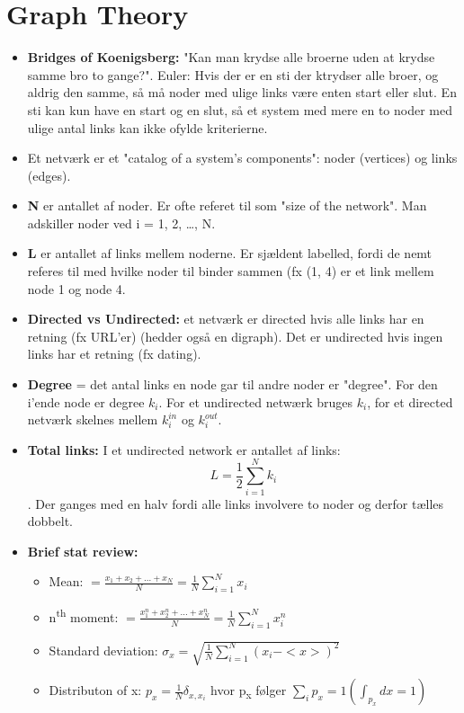 \documentclass[11pt]{article}
\begin{document}
\section{Graph Theory}
\label{sec:org0666558}
\begin{itemize}
\item \textbf{Bridges of Koenigsberg:} "Kan man krydse alle broerne uden at krydse samme bro to gange?". Euler: Hvis der er en sti der ktrydser alle broer, og aldrig den samme, så må noder med ulige links være enten start eller slut. En sti kan kun have en start og en slut, så et system med mere en to noder med ulige antal links kan ikke ofylde kriterierne.

\item Et netværk er et "catalog of a system's components": noder (vertices) og links (edges).

\item \textbf{N} er antallet af noder. Er ofte referet til som "size of the network". Man adskiller noder ved i = 1, 2, \ldots{}, N.

\item \textbf{L} er antallet af links mellem noderne. Er sjældent labelled, fordi de nemt referes til med hvilke noder til binder sammen (fx (1, 4) er et link mellem node 1 og node 4.

\item \textbf{Directed vs Undirected:} et netværk er directed hvis alle links har en retning (fx URL'er) (hedder også en digraph). Det er undirected hvis ingen links har et retning (fx dating).

\item \textbf{Degree} = det antal links en node gar til andre noder er "degree". For den i'ende node er degree \(k_i\). For et undirected netwærk bruges \(k_i\), for et directed netværk skelnes mellem \(k^{in}_i\) og \(k^{out}_i\).

\item \textbf{Total links:} I et undirected network er antallet af links: $$ L = \frac{1}{2} \sum^N_{i = 1} k_i $$. Der ganges med en halv fordi alle links involvere to noder og derfor tælles dobbelt.

\item \textbf{Brief stat review:}
\begin{itemize}
\item Mean: \(< x > = \frac{x_1 + x_2 + ... + x_N}{N} = \frac{1}{N} \sum^N_{i = 1} x_i\)
\item n\textsuperscript{th} moment: \(< x > = \frac{x^n_1 + x^n_2 + ... + x^n_N}{N} = \frac{1}{N} \sum^N_{i = 1} x^n_i\)
\item Standard deviation: \(\sigma_x = \sqrt{\frac{1}{N} \sum^N_{i = 1} (x_i - <x>)^2}\)
\item Distributon of x: \(p_x = \frac{1}{N} \delta_{x, x_i}\) hvor p\textsubscript{x} følger \(\sum_i p_x = 1 (\int_{p_x} dx = 1)\)
\end{itemize}


\end{itemize}
\end{document}

